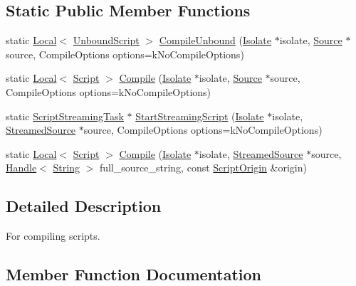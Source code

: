 \subsection*{Static Public Member Functions}
\begin{DoxyCompactItemize}
\item 
static \hyperlink{classv8_1_1Local}{Local}$<$ \hyperlink{classv8_1_1UnboundScript}{Unbound\+Script} $>$ \hyperlink{classv8_1_1ScriptCompiler_a5f590f94e2705d12392c17b7fa097e1d}{Compile\+Unbound} (\hyperlink{classv8_1_1Isolate}{Isolate} $\ast$isolate, \hyperlink{classv8_1_1ScriptCompiler_1_1Source}{Source} $\ast$source, Compile\+Options options=k\+No\+Compile\+Options)
\item 
static \hyperlink{classv8_1_1Local}{Local}$<$ \hyperlink{classv8_1_1Script}{Script} $>$ \hyperlink{classv8_1_1ScriptCompiler_a4cef8b34c2744f6508a9ce53182c19bf}{Compile} (\hyperlink{classv8_1_1Isolate}{Isolate} $\ast$isolate, \hyperlink{classv8_1_1ScriptCompiler_1_1Source}{Source} $\ast$source, Compile\+Options options=k\+No\+Compile\+Options)
\item 
static \hyperlink{classv8_1_1ScriptCompiler_1_1ScriptStreamingTask}{Script\+Streaming\+Task} $\ast$ \hyperlink{classv8_1_1ScriptCompiler_a406bb44ef02d644d94bccd3f7b04f2d4}{Start\+Streaming\+Script} (\hyperlink{classv8_1_1Isolate}{Isolate} $\ast$isolate, \hyperlink{classv8_1_1ScriptCompiler_1_1StreamedSource}{Streamed\+Source} $\ast$source, Compile\+Options options=k\+No\+Compile\+Options)
\item 
static \hyperlink{classv8_1_1Local}{Local}$<$ \hyperlink{classv8_1_1Script}{Script} $>$ \hyperlink{classv8_1_1ScriptCompiler_a45b17bbe1da31c32e3783b91bdde9fcb}{Compile} (\hyperlink{classv8_1_1Isolate}{Isolate} $\ast$isolate, \hyperlink{classv8_1_1ScriptCompiler_1_1StreamedSource}{Streamed\+Source} $\ast$source, \hyperlink{classv8_1_1Handle}{Handle}$<$ \hyperlink{classv8_1_1String}{String} $>$ full\+\_\+source\+\_\+string, const \hyperlink{classv8_1_1ScriptOrigin}{Script\+Origin} \&origin)
\end{DoxyCompactItemize}


\subsection{Detailed Description}
For compiling scripts. 

\subsection{Member Function Documentation}
\hypertarget{classv8_1_1ScriptCompiler_a4cef8b34c2744f6508a9ce53182c19bf}{}
